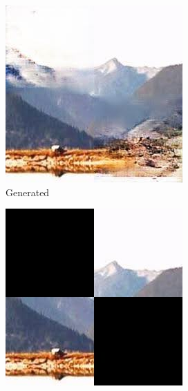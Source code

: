 \documentclass[sigconf]{acmart}
\begin{document}
\begin{figure}[h]
    \centering
    \begin{subfigure}[b]{0.3\linewidth}
        \includegraphics[width=\linewidth]{output3.jpg}
        \caption{Generated}
    \end{subfigure}
    \hfill
    \begin{subfigure}[b]{0.3\linewidth}
        \includegraphics[width=\linewidth]{input3.jpg}

\end{subfigure}
\end{figure}
\end{document}
